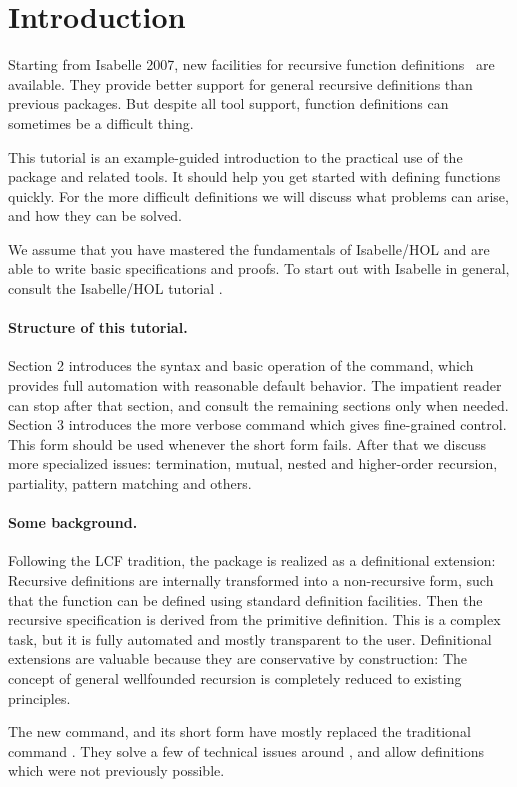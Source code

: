 \section{Introduction}

Starting from Isabelle 2007, new facilities for recursive
function definitions~\cite{krauss2006} are available. They provide
better support for general recursive definitions than previous
packages.  But despite all tool support, function definitions can
sometimes be a difficult thing. 

This tutorial is an example-guided introduction to the practical use
of the package and related tools. It should help you get started with
defining functions quickly. For the more difficult definitions we will
discuss what problems can arise, and how they can be solved.

We assume that you have mastered the fundamentals of Isabelle/HOL
and are able to write basic specifications and proofs. To start out
with Isabelle in general, consult the Isabelle/HOL tutorial
\cite{isa-tutorial}.



\paragraph{Structure of this tutorial.}
Section 2 introduces the syntax and basic operation of the 
command, which provides full automation with reasonable default
behavior.  The impatient reader can stop after that
section, and consult the remaining sections only when needed.
Section 3 introduces the more verbose  command which
gives fine-grained control. This form should be used
whenever the short form fails.
After that we discuss more specialized issues:
termination, mutual, nested and higher-order recursion, partiality, pattern matching
and others.


\paragraph{Some background.}
Following the LCF tradition, the package is realized as a definitional
extension: Recursive definitions are internally transformed into a
non-recursive form, such that the function can be defined using
standard definition facilities. Then the recursive specification is
derived from the primitive definition.  This is a complex task, but it
is fully automated and mostly transparent to the user. Definitional
extensions are valuable because they are conservative by construction:
The  concept of general wellfounded recursion is completely reduced
to existing principles.




The new  command, and its short form  have mostly
replaced the traditional  command \cite{slind-tfl}. They solve
a few of technical issues around , and allow definitions
which were not previously possible.




